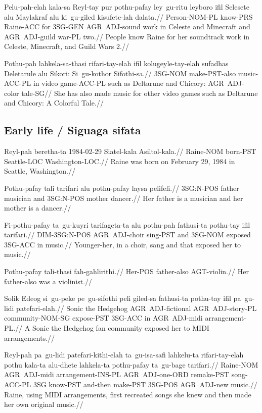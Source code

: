 \ex
\begingl 
\gla  Pelu-pah-elah kala-sa Reyl-tay pur pothu-pafay ley~gu-ritu leyboro ifil Selesete alu Maylakraf alu ki~gu-giled kisufete-lah dalata.//
\glb  Person-NOM-PL know-PRS Raine-ACC for 3SG-GEN AGR~ADJ-sound work in Celeste and Minecraft and AGR~ADJ-guild war-PL two.//
\glft People know Raine for her soundtrack work in Celeste, {} Minecraft, and Guild Wars 2.//
\endgl 
\xe

\ex
\begingl
\gla  Pothu-pah lahkela-sa-thasi rifari-tay-elah ifil kolugeyle-tay-elah sufadhas Deletarule alu Sikori: Si~gu-kothor Sifothi-sa.//
\glb  3SG-NOM make-PST-also music-ACC-PL in video game-ACC-PL such as Deltarune and Chicory: AGR~ADJ-color tale-SG//
\glft She has also made music for other video games such as Deltarune and Chicory: A Colorful Tale.//
\endgl 
\xe

\subsection{Early life / Siguaga sifata}

\ex
\begingl
\gla  Reyl-pah beretha-ta  1984-02-29  Siatel-kala Asiltol-kala.//
\glb  Raine-NOM born-PST    Seattle-LOC  Washington-LOC.//
\glft Raine was born on February 29, 1984 in Seattle, Washington.//
\endgl
\xe

\ex
\begingl
\gla  Pothu-pafay tali  tarifari alu pothu-pafay laysa  pelifefi.//
\glb  3SG:N-POS father musician and 3SG:N-POS mother dancer.//
\glft Her father is a musician and her mother is a dancer.//
\endgl
\xe

\ex
\begingl
\gla  Fi-pothu-pafay ta~gu-kuyri tarifageta-ta alu pothu-pah fathusi-ta pothu-tay ifil tarifari.//
\glb  DIM-3SG:N-POS AGR~ADJ-choir sing-PST and 3SG-NOM exposed 3SG-ACC in music.//
\glft Younger-her, in a choir, sang and that exposed her to music.//
\endgl
\xe

\ex
\begingl
\gla  Pothu-pafay tali-thasi  fah-gahlirithi.//
\glb  Her-POS father-also AGT-violin.//
\glft Her father-also was a violinist.//
\endgl
\xe

\ex
\begingl
\gla  Solik Edeog si~gu-peke pe~gu-sifothi peli giled-sa fathusi-ta pothu-tay ifil pa~gu-lidi patefari-elah.//
\glb  Sonic the Hedgehog AGR~ADJ-fictional AGR~ADJ-story-PL community-NOM-SG expose-PST 3SG-ACC in AGR~ADJ-midi arrangement-PL.//
\glft A Sonic the Hedgehog fan community exposed her to MIDI arrangements.//
\endgl
\xe

\ex
\begingl
\gla  Reyl-pah pa~gu-lidi patefari-kithi-elah ta~gu-isa-safi lahkelu-ta rifari-tay-elah pothu kala-ta alu-dhete lahkela-ta pothu-pafay ta~gu-bage tarifari.//
\glb  Raine-NOM AGR~ADJ-midi arrangement-INS-PL AGR~ADJ-one-ORD remake-PST song-ACC-PL 3SG know-PST and-then make-PST 3SG-POS AGR~ADJ-new music.//
\glft Raine, using MIDI arrangements, first recreated songs she knew and then made her own original music.//
\endgl
\xe


